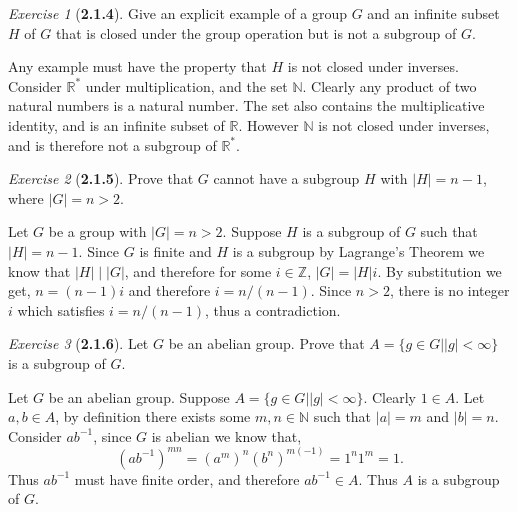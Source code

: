 \documentclass[12pt]{amsart}
\makeatletter
\theoremstyle{remark}
\newtheorem*{exercise}{Exercise}%
\def\RR{\ensuremath{\mathbb R}} %
\def\NN{\ensuremath{\mathbb N}}
\def\ZZ{\ensuremath{\mathbb Z}}
\renewenvironment{proof}[1][\proofname]{\par\doublespacing
  \pushQED{\qed}%
  \normalfont \topsep6\p@\@plus6\p@\relax
  \list{}{%
    \settowidth{\leftmargin}{\itshape\proofname:\hskip\labelsep}%
    \setlength{\labelwidth}{0pt}%
    \setlength{\itemindent}{-\leftmargin}%
  }%
  \item[\hskip\labelsep\itshape#1\@addpunct{:}]\ignorespaces
}{%
  \popQED\endlist\@endpefalse
  \singlespacing
}
\theoremstyle{mycomment}
\makeatother
\begin{document}
\begin{exercise}[\textbf{2.1.4}] Give an explicit example of a group $G$ and an infinite subset $H$ of $G$ that is 
  closed under the group operation but is not a subgroup of $G$. 
    \begin{proof}[Solution] Any example must have the property that $H$ is not closed under inverses. 
      Consider $\RR^*$ under multiplication, and the set $\NN$. Clearly any product of two natural numbers is a natural number. The set also 
      contains the multiplicative identity, and is an infinite subset of $\RR$. However $\NN$ is not closed under inverses, and is therefore not a subgroup of $\RR^*$. 
  \end{proof}
\end{exercise}
\vspace{.15in}


\begin{exercise}[\textbf{2.1.5}] Prove that $G$ cannot have a subgroup $H$ with $|H| = n - 1$, where $|G| = n > 2$.
    \begin{proof} Let $G$ be a group with $|G| = n > 2$. Suppose $H$ is a subgroup of $G$ such that $|H| = n - 1$. 
      Since $G$ is finite and $H$ is a subgroup by Lagrange's Theorem we know that $|H| \mid |G|$, and therefore for some $i \in \ZZ$, $|G|=|H|i$. By substitution we get, 
      $n = (n - 1)i$ and therefore $i = n/(n - 1)$. Since $n>2$, there is no integer $i$ which satisfies $i = n/(n - 1)$, thus a contradiction.
    \end{proof}
\end{exercise}
\vspace{.15in}



\begin{exercise}[\textbf{2.1.6}] Let $G$ be an abelian group. Prove that $A = \{g\in G | |g| < \infty \}$ is a subgroup of $G$. 
  \begin{proof} Let $G$ be an abelian group. Suppose $A = \{g\in G | |g| < \infty \}$. Clearly $1 \in A$. Let $a, b \in A$, by definition 
    there exists some $m, n \in \NN$ such that $|a| = m$ and $|b| = n$. Consider $ab^{-1}$, since $G$ is abelian we know that, 
    \begin{equation*}
      (ab^{-1})^{mn} = (a^m)^n(b^n)^{m(-1)} = 1^n1^m = 1.
    \end{equation*}
    Thus $ab^{-1}$ must have finite order, and therefore $ab^{-1} \in A$. Thus $A$ is a subgroup of $G$.  
    \end{proof}
\end{exercise}
\vspace{.15in}
\end{document}
